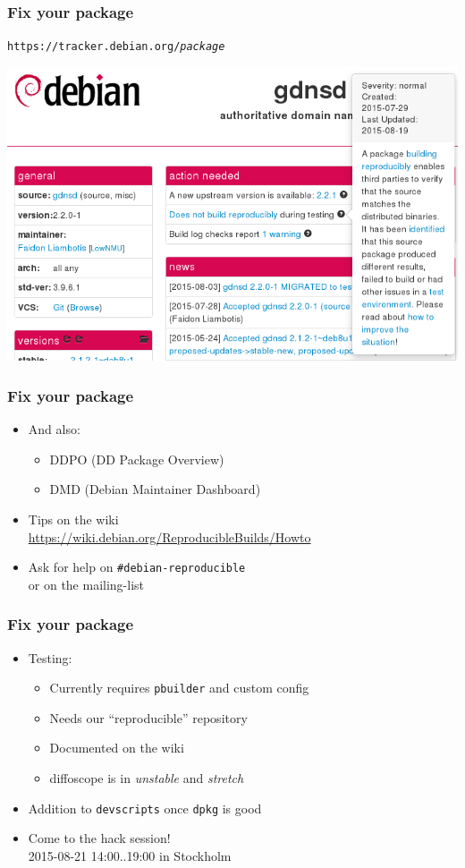 \documentclass[14pt]{beamer}
\begin{document}
\begin{frame}
 \frametitle{Fix your package}

 \begin{center}
  \texttt{https://tracker.debian.org/\textit{package}}

  \includegraphics[width=0.8\linewidth]{images/tracker-gdnsd.png}
 \end{center}
\end{frame}

\begin{frame}
 \frametitle{Fix your package}

 \begin{itemize}
  \item And also:
   \begin{itemize}
    \item DDPO (DD Package Overview)
    \item DMD (Debian Maintainer Dashboard)
   \end{itemize}
  \item Tips on the wiki \\
   {\small \url{https://wiki.debian.org/ReproducibleBuilds/Howto}}
  \item Ask for help on \texttt{\#debian-reproducible} \\
   or on the mailing-list
 \end{itemize}
\end{frame}

\begin{frame}
 \frametitle{Fix your package}

 \begin{itemize}
  \item Testing:
   \begin{itemize}
    \item Currently requires \texttt{pbuilder} and custom config
    \item Needs our “reproducible” repository
    \item Documented on the wiki
    \item diffoscope is in \textit{unstable} and \textit{stretch}
   \end{itemize}
  \item Addition to \texttt{devscripts} once \texttt{dpkg} is good
  \item Come to the hack session! \\
    2015-08-21 14:00..19:00 in Stockholm
 \end{itemize}
\end{frame}
\end{document}
